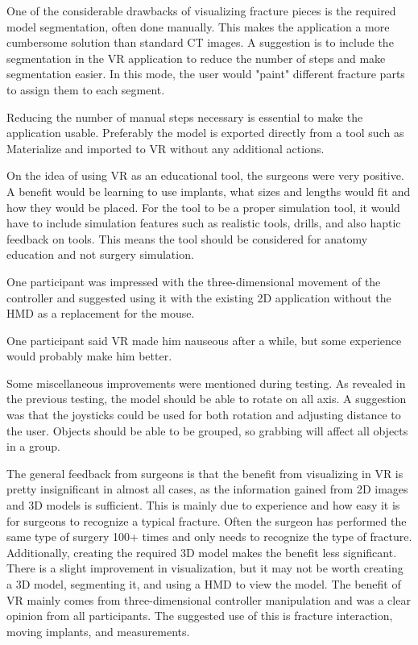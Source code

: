 \documentclass[a4paper]{report}
\begin{document}
One of the considerable drawbacks of visualizing fracture pieces is the required model segmentation, often done manually. This makes the application a more cumbersome solution than standard CT images. A suggestion is to include the segmentation in the VR application to reduce the number of steps and make segmentation easier. In this mode, the user would "paint" different fracture parts to assign them to each segment.

Reducing the number of manual steps necessary is essential to make the application usable. Preferably the model is exported directly from a tool such as Materialize and imported to VR without any additional actions.

On the idea of using VR as an educational tool, the surgeons were very positive. A benefit would be learning to use implants, what sizes and lengths would fit and how they would be placed. For the tool to be a proper simulation tool, it would have to include simulation features such as realistic tools, drills, and also haptic feedback on tools. This means the tool should be considered for anatomy education and not surgery simulation.

One participant was impressed with the three-dimensional movement of the controller and suggested using it with the existing 2D application without the HMD as a replacement for the mouse.

One participant said VR made him nauseous after a while, but some experience would probably make him better.

Some miscellaneous improvements were mentioned during testing. As revealed in the previous testing, the model should be able to rotate on all axis. A suggestion was that the joysticks could be used for both rotation and adjusting distance to the user. Objects should be able to be grouped, so grabbing will affect all objects in a group.


The general feedback from surgeons is that the benefit from visualizing in VR is pretty insignificant in almost all cases, as the information gained from 2D images and 3D models is sufficient.
This is mainly due to experience and how easy it is for surgeons to recognize a typical fracture. Often the surgeon has performed the same type of surgery 100+ times and only needs to recognize the type of fracture. Additionally, creating the required 3D model makes the benefit less significant.
There is a slight improvement in visualization, but it may not be worth creating a 3D model, segmenting it, and using a HMD to view the model.
The benefit of VR mainly comes from three-dimensional controller manipulation and was a clear opinion from all participants. The suggested use of this is fracture interaction, moving implants, and measurements.
\end{document}
